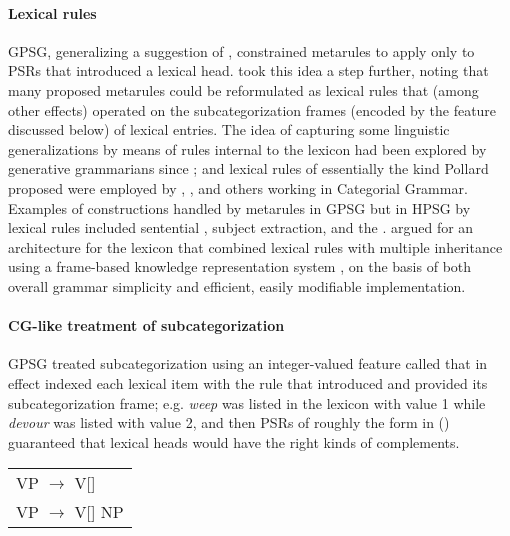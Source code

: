 \documentclass[output=paper,biblatex,babelshorthands,newtxmath,draftmode,colorlinks,citecolor=brown]{langscibook}
\begin{document}
\paragraph*{Lexical rules} GPSG, generalizing a suggestion of \citet{Flickinger1983}, constrained metarules to apply only to PSRs that introduced a lexical head. \citet{Pollard85a-u} took this idea a step further, noting that many proposed metarules could be reformulated as lexical rules that (among other effects) operated on the subcategorization frames (encoded by the \subcat feature discussed below) of lexical entries. The idea of capturing some linguistic generalizations by means of rules internal to the lexicon had been explored by generative grammarians since \citet{Jackendoff75a}; and lexical rules of essentially the kind Pollard proposed were employed by \citet{Bach83}, \citet{Dowty78a}, and others working in Categorial Grammar. Examples of constructions handled by metarules in GPSG but in HPSG by lexical rules included sentential , subject extraction, and the . \citet*{FPW85a} argued for an architecture for the lexicon that combined lexical rules with multiple inheritance using a frame-based knowledge representation system \citep{Minsky1975}, on the basis of both overall grammar simplicity and efficient, easily modifiable implementation.

\paragraph*{CG-like treatment of subcategorization} GPSG\label{page-subcategorization-start} treated subcategorization using an integer-valued feature called \subcat that in effect indexed each lexical item with the rule that introduced and provided its subcategorization frame; e.g. \emph{weep} was listed in the lexicon with \subcat value 1 while \emph{devour} was listed with \subcat value 2, and then PSRs of roughly the form in () guaranteed that lexical heads would have the right kinds of complements.
\ea
\begin{tabular}[t]{l}
          VP $\rightarrow$ V[\subcat 1] \\
          VP $\rightarrow$ V[\subcat 2] NP
\end{tabular}
\z
\end{document}
